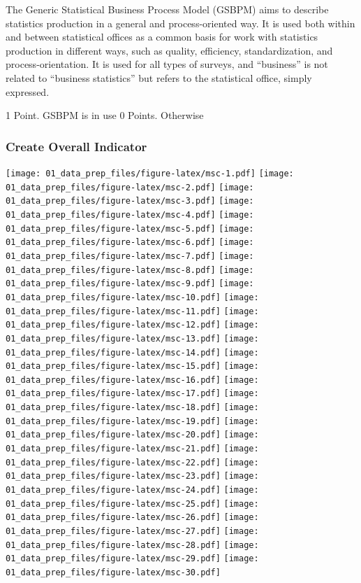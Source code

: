 \documentclass[]{article}
\begin{document}
The Generic Statistical Business Process Model (GSBPM) aims to describe
statistics production in a general and process-oriented way. It is used
both within and between statistical offices as a common basis for work
with statistics production in different ways, such as quality,
efficiency, standardization, and process-orientation. It is used for all
types of surveys, and ``business'' is not related to ``business
statistics'' but refers to the statistical office, simply expressed.

1 Point. GSBPM is in use 0 Points. Otherwise

\hypertarget{create-overall-indicator}{%
\subsubsection{Create Overall
Indicator}\label{create-overall-indicator}}

\texttt{[image: 01\_data\_prep\_files/figure-latex/msc-1.pdf]}
\texttt{[image: 01\_data\_prep\_files/figure-latex/msc-2.pdf]}
\texttt{[image: 01\_data\_prep\_files/figure-latex/msc-3.pdf]}
\texttt{[image: 01\_data\_prep\_files/figure-latex/msc-4.pdf]}
\texttt{[image: 01\_data\_prep\_files/figure-latex/msc-5.pdf]}
\texttt{[image: 01\_data\_prep\_files/figure-latex/msc-6.pdf]}
\texttt{[image: 01\_data\_prep\_files/figure-latex/msc-7.pdf]}
\texttt{[image: 01\_data\_prep\_files/figure-latex/msc-8.pdf]}
\texttt{[image: 01\_data\_prep\_files/figure-latex/msc-9.pdf]}
\texttt{[image: 01\_data\_prep\_files/figure-latex/msc-10.pdf]}
\texttt{[image: 01\_data\_prep\_files/figure-latex/msc-11.pdf]}
\texttt{[image: 01\_data\_prep\_files/figure-latex/msc-12.pdf]}
\texttt{[image: 01\_data\_prep\_files/figure-latex/msc-13.pdf]}
\texttt{[image: 01\_data\_prep\_files/figure-latex/msc-14.pdf]}
\texttt{[image: 01\_data\_prep\_files/figure-latex/msc-15.pdf]}
\texttt{[image: 01\_data\_prep\_files/figure-latex/msc-16.pdf]}
\texttt{[image: 01\_data\_prep\_files/figure-latex/msc-17.pdf]}
\texttt{[image: 01\_data\_prep\_files/figure-latex/msc-18.pdf]}
\texttt{[image: 01\_data\_prep\_files/figure-latex/msc-19.pdf]}
\texttt{[image: 01\_data\_prep\_files/figure-latex/msc-20.pdf]}
\texttt{[image: 01\_data\_prep\_files/figure-latex/msc-21.pdf]}
\texttt{[image: 01\_data\_prep\_files/figure-latex/msc-22.pdf]}
\texttt{[image: 01\_data\_prep\_files/figure-latex/msc-23.pdf]}
\texttt{[image: 01\_data\_prep\_files/figure-latex/msc-24.pdf]}
\texttt{[image: 01\_data\_prep\_files/figure-latex/msc-25.pdf]}
\texttt{[image: 01\_data\_prep\_files/figure-latex/msc-26.pdf]}
\texttt{[image: 01\_data\_prep\_files/figure-latex/msc-27.pdf]}
\texttt{[image: 01\_data\_prep\_files/figure-latex/msc-28.pdf]}
\texttt{[image: 01\_data\_prep\_files/figure-latex/msc-29.pdf]}
\texttt{[image: 01\_data\_prep\_files/figure-latex/msc-30.pdf]}
\end{document}
